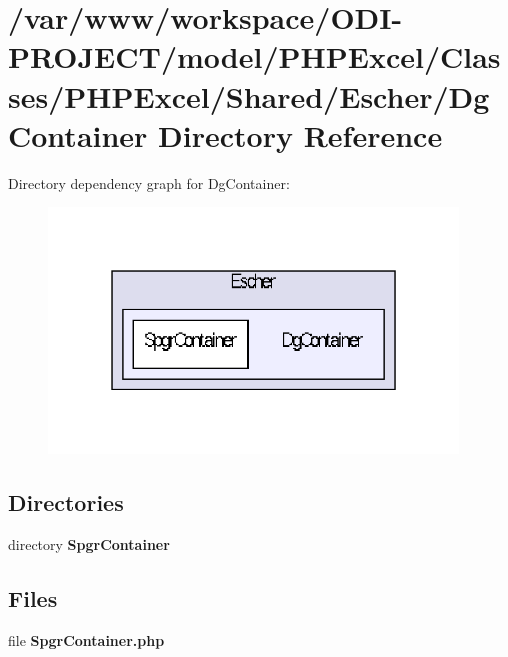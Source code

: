 \section{/var/www/workspace/\+O\+D\+I-\/\+P\+R\+O\+J\+E\+C\+T/model/\+P\+H\+P\+Excel/\+Classes/\+P\+H\+P\+Excel/\+Shared/\+Escher/\+Dg\+Container Directory Reference}
\label{dir_22bf3cfeef3460096e811aceedd973d3}
Directory dependency graph for Dg\+Container\+:\nopagebreak
\begin{figure}[H]
\begin{center}
\leavevmode
\includegraphics[width=308pt]{dir_22bf3cfeef3460096e811aceedd973d3_dep}
\end{center}
\end{figure}
\subsection*{Directories}
\begin{DoxyCompactItemize}
\item 
directory {\bf Spgr\+Container}
\end{DoxyCompactItemize}
\subsection*{Files}
\begin{DoxyCompactItemize}
\item 
file {\bfseries Spgr\+Container.\+php}
\end{DoxyCompactItemize}
